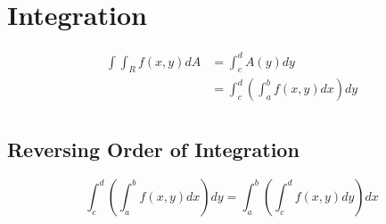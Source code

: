 \section{Integration}

  \begin{align*}
    \int \int_{R} f\left( x, y \right) dA
      &= \int_{c}^{d} A\left( y \right) dy \\
      &= \int_{c}^{d} \left( \int_{a}^{b} f\left( x, y \right) dx \right) dy \\
  \end{align*}

  \subsection{Reversing Order of Integration}

    \begin{equation}
      \int_{c}^{d} \left( \int_{a}^{b} f\left( x, y \right) dx \right) dy
        = \int_{a}^{b} \left( \int_{c}^{d} f\left( x, y \right) dy \right) dx
    \end{equation}